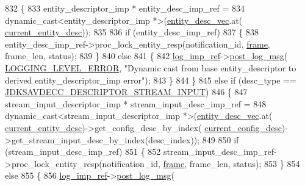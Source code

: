 \begin{DoxyCode}
{832         \{
833             entity\_descriptor\_imp * entity\_desc\_imp\_ref =
834                 \textcolor{keyword}{dynamic\_cast<}entity\_descriptor\_imp *\textcolor{keyword}{>}(\hyperlink{classavdecc__lib_1_1end__station__imp_a72edab41bc56e3c1757944a7df188a3d}{entity\_desc\_vec}.at(
      \hyperlink{classavdecc__lib_1_1end__station__imp_afd78c89df26ba7641e1adb764c0e827d}{current\_entity\_desc}));
835 
836             \textcolor{keywordflow}{if} (entity\_desc\_imp\_ref)
837             \{
838                 entity\_desc\_imp\_ref->proc\_lock\_entity\_resp(notification\_id, 
      \hyperlink{gst__avb__playbin_8c_ac8e710e0b5e994c0545d75d69868c6f0}{frame}, frame\_len, status);
839             \}
840             \textcolor{keywordflow}{else}
841             \{
842                 \hyperlink{namespaceavdecc__lib_acbe3e2a96ae6524943ca532c87a28529}{log\_imp\_ref}->\hyperlink{classavdecc__lib_1_1log_a68139a6297697e4ccebf36ccfd02e44a}{post\_log\_msg}(
      \hyperlink{namespaceavdecc__lib_a501055c431e6872ef46f252ad13f85cdaf2c4481208273451a6f5c7bb9770ec8a}{LOGGING\_LEVEL\_ERROR}, \textcolor{stringliteral}{"Dynamic cast from base entity\_descriptor to derived
       entity\_descriptor\_imp error"});
843             \}
844         \}
845         \textcolor{keywordflow}{else} \textcolor{keywordflow}{if} (desc\_type == \hyperlink{group__descriptor_ga4eb0b7597f11b5fc36f3625acd82e503}{JDKSAVDECC\_DESCRIPTOR\_STREAM\_INPUT})
846         \{
847             stream\_input\_descriptor\_imp * stream\_input\_desc\_imp\_ref =
848                 \textcolor{keyword}{dynamic\_cast<}stream\_input\_descriptor\_imp *\textcolor{keyword}{>}(\hyperlink{classavdecc__lib_1_1end__station__imp_a72edab41bc56e3c1757944a7df188a3d}{entity\_desc\_vec}.at(
      \hyperlink{classavdecc__lib_1_1end__station__imp_afd78c89df26ba7641e1adb764c0e827d}{current\_entity\_desc})->get\_config\_desc\_by\_index(
      \hyperlink{classavdecc__lib_1_1end__station__imp_a60b1af40d35e8a86b0082c54ab6cb6a8}{current\_config\_desc})->get\_stream\_input\_desc\_by\_index(desc\_index));
849 
850             \textcolor{keywordflow}{if} (stream\_input\_desc\_imp\_ref)
851             \{
852                 stream\_input\_desc\_imp\_ref->proc\_lock\_entity\_resp(notification\_id, 
      \hyperlink{gst__avb__playbin_8c_ac8e710e0b5e994c0545d75d69868c6f0}{frame}, frame\_len, status);
853             \}
854             \textcolor{keywordflow}{else}
855             \{
856                 \hyperlink{namespaceavdecc__lib_acbe3e2a96ae6524943ca532c87a28529}{log\_imp\_ref}->\hyperlink{classavdecc__lib_1_1log_a68139a6297697e4ccebf36ccfd02e44a}{post\_log\_msg}(
}
\end{DoxyCode}
